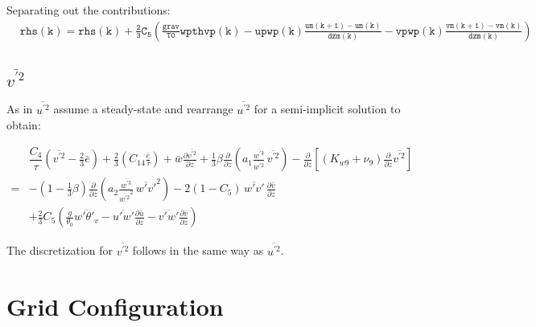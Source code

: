 \documentclass[11pt,fleqn]{article}
\newcommand{\ptlder}[2]{\frac{\partial #1}{\partial #2}}
\begin{document}
Separating out the contributions:
%
\begin{equation}
\begin{split}
&\mathtt{rhs(k) = rhs(k) + \frac{2}{3} C_5 
  \left( 
    \frac{grav}{T0} wpthvp(k) 
       - upwp(k) \frac{um(k+1)-um(k)}{dzm(k)}
       - vpwp(k) \frac{vm(k+1)-vm(k)}{dzm(k)}
  \right)}
\end{split}
\end{equation}
%

\subsection{$\overline{v^{'2}}$}
As in $\overline{u^{'2}}$ assume a steady-state and rearrange $\overline{u^{'2}}$ for a 
semi-implicit solution to obtain:

\begin{equation}
\begin{split}
\label{eq_vp2_ss}
& \dfrac{C_4}{\tau} 
  \left(
    \overline{v^{'2}} - \frac{2}{3} \bar{e}
  \right)
  + \frac{2}{3} 
     \left( 
        C_{14} \frac{\bar{e}}{\tau} 
     \right) 
+ \bar{w}\ptlder{\overline{v^{'2}}}{z}
+ \frac{1}{3} \beta
   \ptlder{}{z}
     \left( 
       a_1
       \frac{\overline{w^{'3}}}{\overline{w^{'2}}} \,
       \overline{v^{'2}}
     \right)
- \ptlder{}{z} \left[ \left( K_{w9} + \nu_9 \right)
                      \ptlder{}{z} \overline{v^{'2}}
               \right]  \\
=& - \left( 1 - \frac{1}{3}\beta \right)
       \ptlder{}{z}
         \left( 
           a_2
           \frac{\overline{w^{'3}}}{\overline{w^{'2}}^2} \,
           \overline{w'v'}^2
         \right)
   - 2 (1 - C_{5} ) \, \overline{w'v'} \, \ptlder{\bar{v}}{z} \\
 & + \frac{2}{3} C_5
     \left(
       \frac{g}{\theta_0} \overline{w'\theta'_v} 
       - \overline{u'w'}\ptlder{\bar{u}}{z} 
       - \overline{v'w'}\ptlder{\bar{v}}{z} 
     \right)
\end{split}
\end{equation}

The discretization for $\overline{v^{'2}}$ follows in the same way as $\overline{u^{'2}}$.

\section{Grid Configuration}
\end{document}
